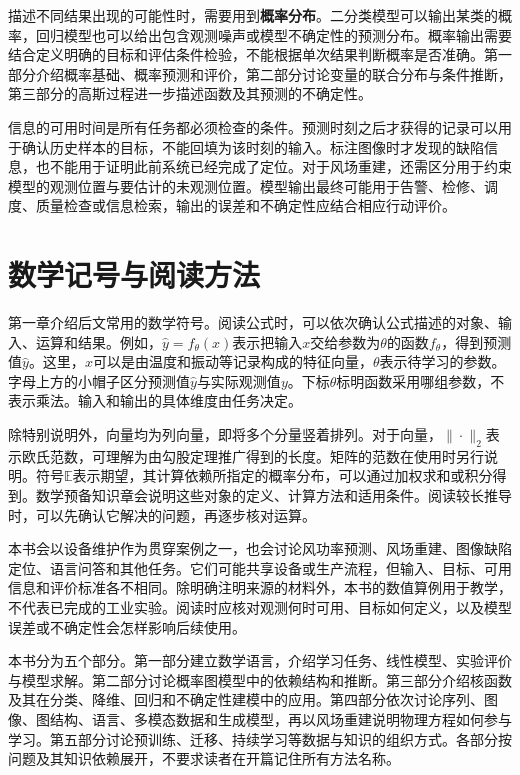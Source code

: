 \documentclass[UTF8,11pt,zihao=false,linespread=1.3,openany]{ctexbook}
\begin{document}
描述不同结果出现的可能性时，需要用到\textbf{概率分布}。二分类模型可以输出某类的概率，回归模型也可以给出包含观测噪声或模型不确定性的预测分布。概率输出需要结合定义明确的目标和评估条件检验，不能根据单次结果判断概率是否准确。第一部分介绍概率基础、概率预测和评价，第二部分讨论变量的联合分布与条件推断，第三部分的高斯过程进一步描述函数及其预测的不确定性。

信息的可用时间是所有任务都必须检查的条件。预测时刻之后才获得的记录可以用于确认历史样本的目标，不能回填为该时刻的输入。标注图像时才发现的缺陷信息，也不能用于证明此前系统已经完成了定位。对于风场重建，还需区分用于约束模型的观测位置与要估计的未观测位置。模型输出最终可能用于告警、检修、调度、质量检查或信息检索，输出的误差和不确定性应结合相应行动评价。

\section*{数学记号与阅读方法}
第一章介绍后文常用的数学符号。阅读公式时，可以依次确认公式描述的对象、输入、运算和结果。例如，$\hat y=f_\theta(x)$表示把输入$x$交给参数为$\theta$的函数$f_\theta$，得到预测值$\hat y$。这里，$x$可以是由温度和振动等记录构成的特征向量，$\theta$表示待学习的参数。字母上方的小帽子区分预测值$\hat y$与实际观测值$y$。下标$\theta$标明函数采用哪组参数，不表示乘法。输入和输出的具体维度由任务决定。

除特别说明外，向量均为列向量，即将多个分量竖着排列。对于向量，$\|\cdot\|_2$表示欧氏范数，可理解为由勾股定理推广得到的长度。矩阵的范数在使用时另行说明。符号$\mathbb{E}$表示期望，其计算依赖所指定的概率分布，可以通过加权求和或积分得到。数学预备知识章会说明这些对象的定义、计算方法和适用条件。阅读较长推导时，可以先确认它解决的问题，再逐步核对运算。

本书会以设备维护作为贯穿案例之一，也会讨论风功率预测、风场重建、图像缺陷定位、语言问答和其他任务。它们可能共享设备或生产流程，但输入、目标、可用信息和评价标准各不相同。除明确注明来源的材料外，本书的数值算例用于教学，不代表已完成的工业实验。阅读时应核对观测何时可用、目标如何定义，以及模型误差或不确定性会怎样影响后续使用。

本书分为五个部分。第一部分建立数学语言，介绍学习任务、线性模型、实验评价与模型求解。第二部分讨论概率图模型中的依赖结构和推断。第三部分介绍核函数及其在分类、降维、回归和不确定性建模中的应用。第四部分依次讨论序列、图像、图结构、语言、多模态数据和生成模型，再以风场重建说明物理方程如何参与学习。第五部分讨论预训练、迁移、持续学习等数据与知识的组织方式。各部分按问题及其知识依赖展开，不要求读者在开篇记住所有方法名称。
\end{document}

